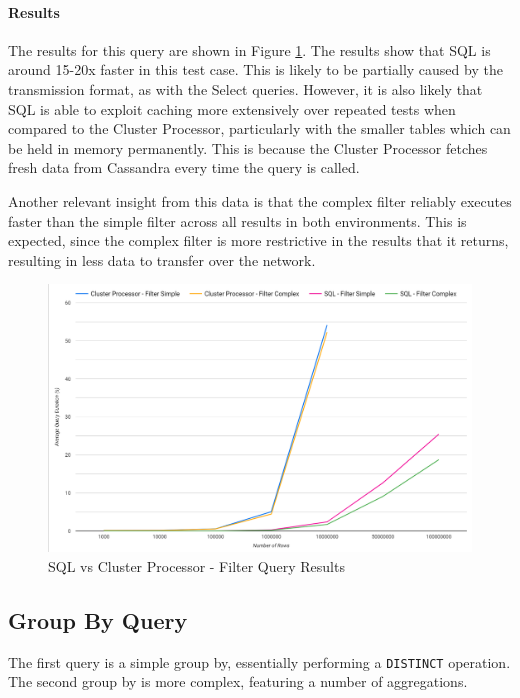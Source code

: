 \paragraph{Results}
The results for this query are shown in Figure \ref{fig:filter-graph}. The results show that SQL is around 15-20x faster in this test case. This is likely to be partially caused by the transmission format, as with the Select queries. However, it is also likely that SQL is able to exploit caching more extensively over repeated tests when compared to the Cluster Processor, particularly with the smaller tables which can be held in memory permanently. This is because the Cluster Processor fetches fresh data from Cassandra every time the query is called.

Another relevant insight from this data is that the complex filter reliably executes faster than the simple filter across all results in both environments.
This is expected, since the complex filter is more restrictive in the results that it returns, resulting in less data to transfer over the network.

\begin{figure}[htp]
	\centering
	\includegraphics[width=0.8\linewidth]{chapters/diagrams/testing/filter-1k-100m}
	\caption{SQL vs Cluster Processor - Filter Query Results} 
	\label{fig:filter-graph}
\end{figure}


\subsection{Group By Query}
The first query is a simple group by, essentially performing a \texttt{DISTINCT} operation. 
The second group by is more complex, featuring a number of aggregations. %

